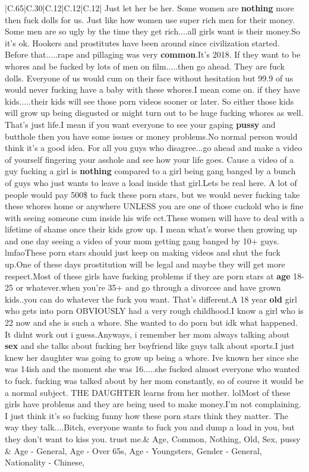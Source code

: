\documentclass[11pt]{article}
\newlength\mylength
\begin{document}
\begin{center}
\begin{longtable}{|C{.65\mylength}|C{.30\mylength}|C{.12\mylength}|C{.12\mylength}|C{.12\mylength}|}
  \small Just let her be her. Some women are \textbf{nothing} more then fuck dolls for us.  Just like how women use super rich men for their money. Some men are so ugly by the time they get rich....all girls want is their money.So it's ok.  Hookers and prostitutes have been around since civilization started. Before that.....rape and pillaging was very \textbf{common}.It's 2018.  If they want to be whores and be fucked by lots of men on film.....then go ahead.  They are fuck dolls.  Everyone of us would cum on their face without hesitation but 99.9 of us would never fucking have a baby with these whores.I mean come on.  if they have kids.....their kids will see those porn videos sooner or later.  So either those kids will grow up being disgusted or might turn out to be huge fucking whores as well.  That's just life.I mean if you want everyone to see your gaping \textbf{pussy} and butthole then you have some issues or money problems.No normal person would think it's a good idea. For all you guys who disagree...go ahead and make a video of yourself fingering your asshole and see how your life goes.  Cause a video of a guy fucking a girl is \textbf{nothing} compared to a girl being gang banged by a bunch of guys who just wants to leave a load inside that girl.Lets be real here. A lot of people would pay 500\$ to fuck these porn stars, but we would never fucking take these whores home or anywhere UNLESS you are one of those cuckold who is fine with seeing someone cum inside his wife ect.These women will have to deal with a lifetime of shame once their kids grow up.  I mean what's worse then growing up and one day seeing a video of your mom getting gang banged by 10+ guys. lmfaoThese porn stars should just keep on making videos and shut the fuck up.One of these days prostitution will be legal and maybe they will get more respect.Most of these girls have fucking problems if they are porn stars at \textbf{age} 18-25 or whatever.when you're 35+ and go through a divorcee and have grown kids..you can do whatever the fuck you want.  That's different.A 18 year \textbf{old} girl who gets into porn OBVIOUSLY had a very rough childhood.I know a girl who is 22 now and she is such a whore.  She wanted to do porn but idk what happened. It didnt work out i guess.Anyways, i remember her mom always talking about \textbf{sex} and she talks about fucking her boyfriend like guys talk about sports.I just knew her daughter was going to grow up being a whore. Ive known her since she was 14ish and the moment she was 16.....she fucked almost everyone who wanted to fuck.  fucking was talked about by her mom constantly, so of course it would be a normal subject. THE DAUGHTER learns from her mother.  lolMost of these girls have problems and they are being used to make money.I'm not complaining. I just think it's so fucking funny how these porn stars think they matter. The way they talk....Bitch, everyone wants to fuck you and dump a load in you, but they don't want to kiss you. trust me.\normalsize   & Age, Common, Nothing, Old, Sex, pussy & Age - General, Age - Over 65s, Age - Youngsters, Gender - General, Nationality - Chinese, 
\end{longtable}
\end{center}
\end{document}
